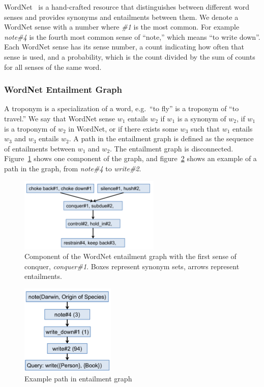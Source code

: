 \documentclass{article}
\begin{document}
WordNet~\cite{fellbaum98wordnet} is a hand-crafted resource that distinguishes between different word senses and provides synonyms and entailments between them. We denote a WordNet sense with a number where \textit{\#1} is the most common. For example \textit{note\#4} is the fourth most common sense of ``note,'' which means ``to write down''. Each WordNet sense has its sense number, a count indicating how often that sense is used, and a probability, which is the count divided by the sum of counts for all senses of the same word.

\subsubsection{WordNet Entailment Graph}
A troponym is a specialization of a word, e.g.\ ``to fly'' is a troponym of ``to travel.'' We say that WordNet sense $w_1$ entails $w_2$ if $w_1$ is a synonym of $w_2$, if $w_1$ is a troponym of $w_2$ in WordNet, or if there exists some $w_3$ such that $w_1$ entails $w_3$ and $w_3$ entails $w_2$. A path in the entailment graph is defined as the sequence of entailments between $w_1$ and $w_2$. The entailment graph is disconnected. Figure~\ref{wordnet-graph} shows one component of the graph, and figure~\ref{example-path} shows an example of a path in the graph, from \textit{note\#4} to \textit{write\#2}.

\begin{figure}[h]
\begin{center}
\includegraphics[width=0.6\textwidth]{figures/wordnet-graph.pdf}
\end{center}
\caption{Component of the WordNet entailment graph with the first sense of conquer, \textit{conquer\#1}. Boxes represent synonym sets, arrows represent entailments.}\label{wordnet-graph}
\end{figure}

\begin{figure}[h]
\begin{center}
\includegraphics[width=0.4\textwidth]{figures/example-path.pdf}
\end{center}
\caption{Example path in entailment graph}\label{example-path}
\end{figure}
\end{document}
